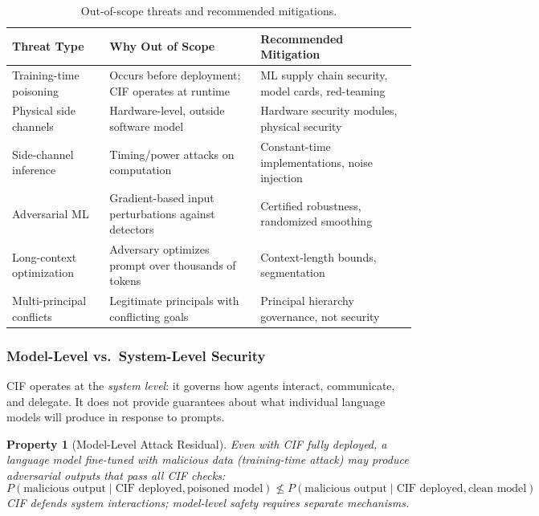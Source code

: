 \documentclass[
]{article}
\newtheorem{property}{Property}[section]
\begin{document}
\begin{table}[htbp]
\centering
\caption{Out-of-scope threats and recommended mitigations.}
\label{tab:out-of-scope}
\begin{tabular}{@{}lp{5cm}p{5cm}@{}}
\toprule
Threat Type & Why Out of Scope & Recommended Mitigation \\
\midrule
Training-time poisoning & Occurs before deployment; CIF operates at runtime & ML supply chain security, model cards, red-teaming \\
Physical side channels & Hardware-level, outside software model & Hardware security modules, physical security \\
Side-channel inference & Timing/power attacks on computation & Constant-time implementations, noise injection \\
Adversarial ML & Gradient-based input perturbations against detectors & Certified robustness, randomized smoothing \\
Long-context optimization & Adversary optimizes prompt over thousands of tokens & Context-length bounds, segmentation \\
Multi-principal conflicts & Legitimate principals with conflicting goals & Principal hierarchy governance, not security \\
\bottomrule
\end{tabular}
\end{table}

\subsubsection{Model-Level vs.~System-Level
Security}\label{model-level-vs.-system-level-security}

CIF operates at the \textit{system level}: it governs how agents
interact, communicate, and delegate. It does not provide guarantees
about what individual language models will produce in response to
prompts.

\begin{property}[Model-Level Attack Residual]
\label{prop:model-level-residual}
Even with CIF fully deployed, a language model fine-tuned with malicious data (training-time attack) may produce adversarial outputs that pass all CIF checks:
\begin{equation}
\label{eq:model-residual}
P(\text{malicious output} \mid \text{CIF deployed}, \text{poisoned model}) \not\leq P(\text{malicious output} \mid \text{CIF deployed}, \text{clean model})
\end{equation}
CIF defends system interactions; model-level safety requires separate mechanisms.
\end{property}
\end{document}
